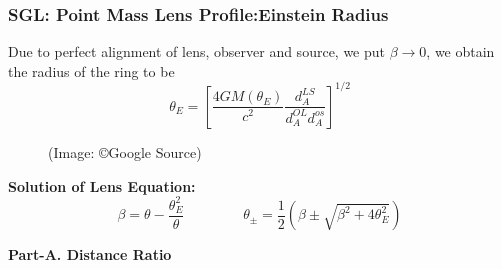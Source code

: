\documentclass[10pt,xcolor={dvipsnames}]{beamer}
\begin{document}
\begin{frame}
 \frametitle{\textbf{SGL}: Point Mass Lens Profile:{\large  Einstein Radius}}
Due to perfect alignment of lens, observer and source, we put $\beta \rightarrow 0$, we obtain the radius of the ring to be
$$
\theta_{E}=\left[\dfrac{4 G M\left(\theta_{E}\right)}{c^{2}} \dfrac{d_{A}^{L S}}{d_{A}^{O L} d_{A}^{o s}}\right]^{1 / 2}
$$
\begin{figure}%
    \centering
    \qquad
    \subfloat[Arc]{{\texttt{[image: cp3]} }}%
\begin{scriptsize}
{(Image: \copyright Google Source)}

\end{scriptsize}
\end{figure}
 \textbf{Solution of Lens Equation:}
$$
\beta=\theta-\dfrac{\theta_{E}^{2}}{\theta}~~~~~~~~~~~~~~~~~~~
{\boxed{\theta_{\pm}=\dfrac{1}{2}\left(\beta \pm \sqrt{\beta^{2}+4 \theta_{E}^{2}}\right)}}
$$
 \end{frame}
 \begin{frame}
\begin{center}
\vspace{10mm}
\end{center}
 \end{frame}
 \begin{frame}
\begin{center}
\textbf{Part-A. Distance Ratio}
\end{center}
\end{frame}
\end{document}
